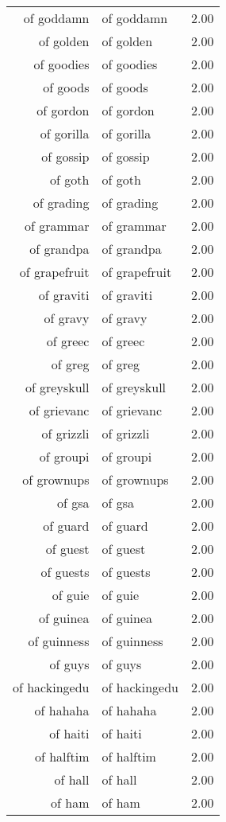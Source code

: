 \begin{table}[ht]
\begin{tabular}{rlr}
  of goddamn & of goddamn & 2.00 \\ 
  of golden & of golden & 2.00 \\ 
  of goodies & of goodies & 2.00 \\ 
  of goods & of goods & 2.00 \\ 
  of gordon & of gordon & 2.00 \\ 
  of gorilla & of gorilla & 2.00 \\ 
  of gossip & of gossip & 2.00 \\ 
  of goth & of goth & 2.00 \\ 
  of grading & of grading & 2.00 \\ 
  of grammar & of grammar & 2.00 \\ 
  of grandpa & of grandpa & 2.00 \\ 
  of grapefruit & of grapefruit & 2.00 \\ 
  of graviti & of graviti & 2.00 \\ 
  of gravy & of gravy & 2.00 \\ 
  of greec & of greec & 2.00 \\ 
  of greg & of greg & 2.00 \\ 
  of greyskull & of greyskull & 2.00 \\ 
  of grievanc & of grievanc & 2.00 \\ 
  of grizzli & of grizzli & 2.00 \\ 
  of groupi & of groupi & 2.00 \\ 
  of grownups & of grownups & 2.00 \\ 
  of gsa & of gsa & 2.00 \\ 
  of guard & of guard & 2.00 \\ 
  of guest & of guest & 2.00 \\ 
  of guests & of guests & 2.00 \\ 
  of guie & of guie & 2.00 \\ 
  of guinea & of guinea & 2.00 \\ 
  of guinness & of guinness & 2.00 \\ 
  of guys & of guys & 2.00 \\ 
  of hackingedu & of hackingedu & 2.00 \\ 
  of hahaha & of hahaha & 2.00 \\ 
  of haiti & of haiti & 2.00 \\ 
  of halftim & of halftim & 2.00 \\ 
  of hall & of hall & 2.00 \\ 
  of ham & of ham & 2.00 \\ 

\end{tabular}
\end{table}
